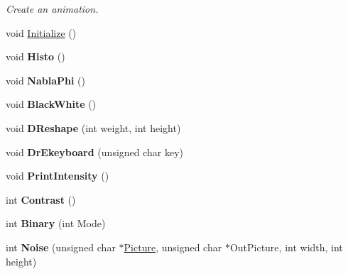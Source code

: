 \begin{DoxyCompactItemize}
\begin{DoxyCompactList}\small\item\em \-Create an animation. \end{DoxyCompactList}\item 
void \hyperlink{classDrEffect_a98b1050f09da390896f964fb7a892391}{\-Initialize} ()
\item 
\hypertarget{classDrEffect_a8121ce6dcaabd895864fcb398d61830a}{void {\bfseries \-Histo} ()}\label{classDrEffect_a8121ce6dcaabd895864fcb398d61830a}

\item 
\hypertarget{classDrEffect_a4ac7178d0dc54a6e3ef5baf06f7c0f6a}{void {\bfseries \-Nabla\-Phi} ()}\label{classDrEffect_a4ac7178d0dc54a6e3ef5baf06f7c0f6a}

\item 
\hypertarget{classDrEffect_af982d1688f2311db74fc3f30bcdb793c}{void {\bfseries \-Black\-White} ()}\label{classDrEffect_af982d1688f2311db74fc3f30bcdb793c}

\item 
\hypertarget{classDrEffect_a79efe43daa44b6da6e1c3179c97625ed}{void {\bfseries \-D\-Reshape} (int weight, int height)}\label{classDrEffect_a79efe43daa44b6da6e1c3179c97625ed}

\item 
\hypertarget{classDrEffect_ac9184736d5fec94273a1784787a387c9}{void {\bfseries \-Dr\-Ekeyboard} (unsigned char key)}\label{classDrEffect_ac9184736d5fec94273a1784787a387c9}

\item 
\hypertarget{classDrEffect_a276658b556a1c7496e893a4888ffd0a0}{void {\bfseries \-Print\-Intensity} ()}\label{classDrEffect_a276658b556a1c7496e893a4888ffd0a0}

\item 
\hypertarget{classDrEffect_a87cab2148c827f9de25acf21b7b75e69}{int {\bfseries \-Contrast} ()}\label{classDrEffect_a87cab2148c827f9de25acf21b7b75e69}

\item 
\hypertarget{classDrEffect_ac569c02507323cdda29fb1e184932f26}{int {\bfseries \-Binary} (int \-Mode)}\label{classDrEffect_ac569c02507323cdda29fb1e184932f26}

\item 
\hypertarget{classDrEffect_aaf6edb6412f345f308004d4bbdfe6f21}{int {\bfseries \-Noise} (unsigned char $\ast$\hyperlink{classDraw_a45ed15a0527d5ba75107645dc8467078}{\-Picture}, unsigned char $\ast$\-Out\-Picture, int width, int height)}\label{classDrEffect_aaf6edb6412f345f308004d4bbdfe6f21}


\end{DoxyCompactItemize}
